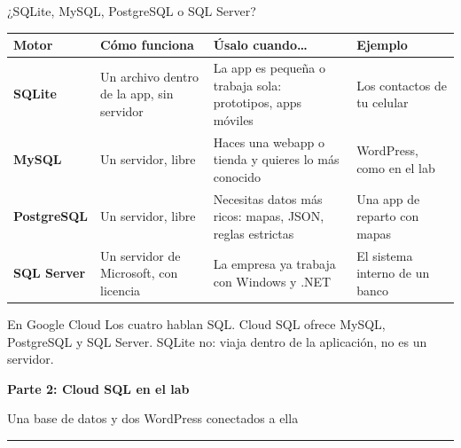 \documentclass[aspectratio=169,10pt,c]{beamer}
\newcommand{\separador}[2]{%
\begin{frame}[plain]
\vfill
\begin{center}
{\fontsize{29}{34}\selectfont\bfseries #1}\par
\vspace{2mm}
{\small #2}\par
\vspace{4mm}
{\color{utpRojo}\rule{8.5cm}{1.2pt}}
\end{center}
\vfill
\end{frame}}
\begin{document}
\begin{frame}{¿SQLite, MySQL, PostgreSQL o SQL Server?}
\renewcommand{\arraystretch}{1.3}
\centering\small
\begin{tabular}{@{}p{2.1cm}>{\raggedright\arraybackslash}p{3.6cm}>{\raggedright\arraybackslash}p{4.0cm}>{\raggedright\arraybackslash}p{3.0cm}@{}}
\toprule
\textbf{Motor} & \textbf{Cómo funciona} & \textbf{Úsalo cuando\ldots} & \textbf{Ejemplo}\\
\midrule
\textbf{SQLite} & Un archivo dentro de la app, sin servidor & La app es pequeña o trabaja sola: prototipos, apps móviles & Los contactos de tu celular\\
\textbf{MySQL} & Un servidor, libre & Haces una webapp o tienda y quieres lo más conocido & WordPress, como en el lab\\
\textbf{PostgreSQL} & Un servidor, libre & Necesitas datos más ricos: mapas, JSON, reglas estrictas & Una app de reparto con mapas\\
\textbf{SQL Server} & Un servidor de Microsoft, con licencia & La empresa ya trabaja con Windows y .NET & El sistema interno de un banco\\
\bottomrule
\end{tabular}
\par\vspace{3mm}
\begin{alertblock}{En Google Cloud}
\small Los cuatro hablan SQL. Cloud SQL ofrece MySQL, PostgreSQL y SQL Server. SQLite no: viaja dentro de la aplicación, no es un servidor.
\end{alertblock}
\end{frame}

\separador{Parte 2: Cloud SQL en el lab}{Una base de datos y dos WordPress conectados a ella}
\end{document}
